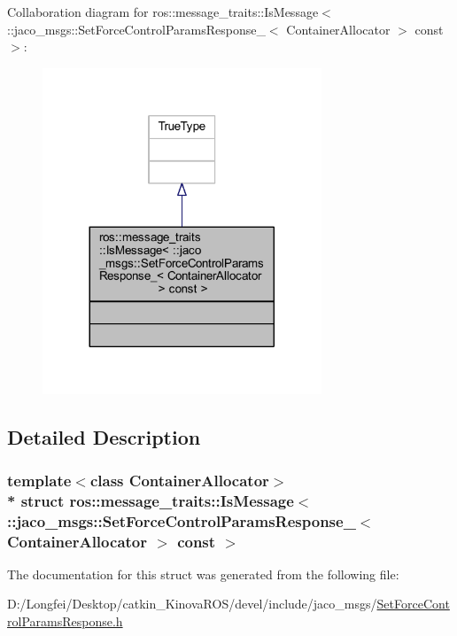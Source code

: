 Collaboration diagram for ros\+:\+:message\+\_\+traits\+:\+:Is\+Message$<$ \+:\+:jaco\+\_\+msgs\+:\+:Set\+Force\+Control\+Params\+Response\+\_\+$<$ Container\+Allocator $>$ const $>$\+:
\nopagebreak
\begin{figure}[H]
\begin{center}
\leavevmode
\includegraphics[width=236pt]{de/da5/structros_1_1message__traits_1_1IsMessage_3_01_1_1jaco__msgs_1_1SetForceControlParamsResponse___f6da79f209b8712f085e9ad1d680cbcf}
\end{center}
\end{figure}


\subsection{Detailed Description}
\subsubsection*{template$<$class Container\+Allocator$>$\\*
struct ros\+::message\+\_\+traits\+::\+Is\+Message$<$ \+::jaco\+\_\+msgs\+::\+Set\+Force\+Control\+Params\+Response\+\_\+$<$ Container\+Allocator $>$ const  $>$}



The documentation for this struct was generated from the following file\+:\begin{DoxyCompactItemize}
\item 
D\+:/\+Longfei/\+Desktop/catkin\+\_\+\+Kinova\+R\+O\+S/devel/include/jaco\+\_\+msgs/\hyperlink{SetForceControlParamsResponse_8h}{Set\+Force\+Control\+Params\+Response.\+h}\end{DoxyCompactItemize}
